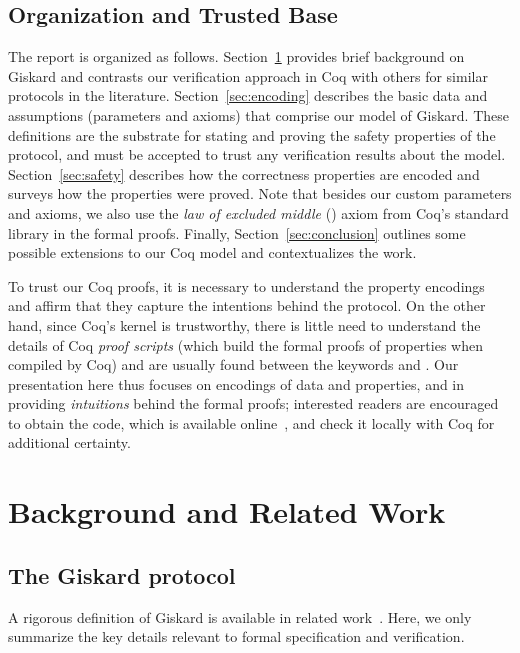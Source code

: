 \documentclass{easychair}
\begin{document}
\subsection{Organization and Trusted Base}
The report is organized as follows. Section~\ref{sec:background} provides brief background on Giskard and contrasts our verification approach in Coq with others for similar protocols in the literature.
%
Section~\ref{sec:encoding} describes the basic data and assumptions (parameters and axioms) that comprise our model of Giskard. These definitions are the substrate for stating and proving the safety properties of the protocol, and must be accepted to trust any verification results about the model. Section~\ref{sec:safety} describes how the correctness properties are encoded and surveys how the properties were proved. Note that besides our custom parameters and axioms, we also use the \emph{law of excluded middle} () axiom from Coq's standard library in the formal proofs. Finally, Section~\ref{sec:conclusion} outlines some possible extensions to our Coq model and contextualizes the work.

To trust our Coq proofs, it is necessary to understand the property encodings and affirm that they capture the intentions behind the protocol. On the other hand, since Coq's kernel is trustworthy, there is little need to understand the details of Coq \emph{proof scripts} (which build the formal proofs of properties when compiled by Coq) and are usually found between the keywords  and . Our presentation here thus focuses on encodings of data and properties, and in providing \emph{intuitions} behind the formal proofs; interested readers are encouraged to obtain the code, which is available online~\cite{CoqGiskard}, and check it locally with Coq for additional certainty.

\section{Background and Related Work}
\label{sec:background}
\subsection{The Giskard protocol}
\label{sec:proto-overview}
A rigorous definition of Giskard is available in related work~\cite{GiskardSpec}. Here, we only summarize the key details relevant to formal specification and verification.
\end{document}
